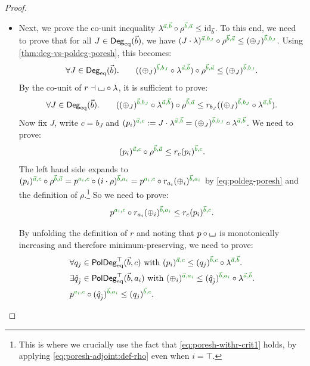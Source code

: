 \documentclass[a4paper]{memoir}
\begin{document}
\begin{proof}
\begin{enumerate}
\begin{itemize}
\begin{itemize}
				\item Next, we prove the co-unit inequality $\lambda \pmrhom{\vec a}{\vec b} \circ \rho \pmrhom{\vec b}{\vec a} \leq \id_{\vec b}$.
				To this end, we need to prove that for all $J \in {\mathsf{Deg}_{\mathrm{eq}}}(\vec b)$, we have $(J \cdot \lambda)\pmrhom{\vec a}{b_J} \circ \rho \pmrhom{\vec b}{\vec a} \leq (\pospol_J)\pmrhom{\vec b}{b_J}$.
				Using \cref{thm:deg-vs-poldeg-poresh}, this becomes:
				\[
					\forall J \in \Degeq(\vec b). \qquad
					((\pospol_J)\pmrhom{\vec b}{b_J} \circ \lambda\pmrhom{\vec a}{\vec b}) \circ \rho \pmrhom{\vec b}{\vec a} \leq (\pospol_J)\pmrhom{\vec b}{b_J}.
				\]
				By the co-unit of $r \dashv {\llcorner\hspace{-.4ex}\lrcorner} \circ \lambda$, it is sufficient to prove:
				\[
					\forall J \in \Degeq(\vec b). \qquad
					((\pospol_J)\pmrhom{\vec b}{b_J} \circ \lambda\pmrhom{\vec a}{\vec b}) \circ \rho \pmrhom{\vec b}{\vec a}
					\leq
					r_{b_J}((\pospol_J)\pmrhom{\vec b}{b_J} \circ \lambda\pmrhom{\vec a}{\vec b}).
				\]
				Now fix $J$, write $c = b_J$ and $(p_i)\pmrhom{\vec a}{c} := J \cdot \lambda\pmrhom{\vec a}{\vec b} = (\pospol_J)\pmrhom{\vec b}{b_J} \circ \lambda\pmrhom{\vec a}{\vec b}$.
				We need to prove:
				\[
					(p_i)\pmrhom{\vec a}{c} \circ \rho \pmrhom{\vec b}{\vec a}
					\leq
					r_{c}(p_i)\pmrhom{\vec b}{c}.
				\]
				The left hand side expands to $(p_i)\pmrhom{\vec a}{c} \circ \rho \pmrhom{\vec b}{\vec a} = p\pmrhom{a_i}{c} \circ (i \cdot \rho) \pmrhom{\vec b}{a_i} = p\pmrhom{a_i}{c} \circ r_{a_i}(\pospol_i)\pmrhom{\vec b}{a_i}$ by \cref{eq:poldeg-poresh} and the definition of $\rho$.\footnote{This is where we crucially use the fact that \cref{eq:poresh-withr-crit1} holds, by applying \cref{eq:poresh-adjoint:def-rho} even when $i = \top$.}
				So we need to prove:
				\[
					p\pmrhom{a_i}{c} \circ r_{a_i}(\pospol_i)\pmrhom{\vec b}{a_i}
					\leq
					r_{c}(p_i)\pmrhom{\vec b}{c}.
				\]
				
				By unfolding the definition of $r$ and noting that $p \circ {\llcorner\hspace{-.4ex}\lrcorner}$ is monotonically increasing and therefore minimum-preserving, we need to prove:
				\begin{align*}
					&\forall q_j \in \poldegeqtop(\vec b, c) \text{ with } (p_i)\pmrhom{\vec a}{c} \leq (q_j)\pmrhom{\vec b}{c} \circ \lambda \pmrhom{\vec a}{\vec b} .\\
					&\exists \hat q_{\hat j} \in \poldegeqtop(\vec b, a_i) \text{ with } (\pospol_i)\pmrhom{\vec a}{a_i} \leq (\hat q_{\hat j})\pmrhom{\vec b}{a_i} \circ \lambda \pmrhom{\vec a}{\vec b} .\\
					& p\pmrhom{a_i}{c} \circ (\hat q_{\hat j})\pmrhom{\vec b}{a_i} \leq (q_j)\pmrhom{\vec b}{c}.
				\end{align*}
				

\end{itemize}
\end{itemize}
\end{enumerate}
\end{proof}
\end{document}
